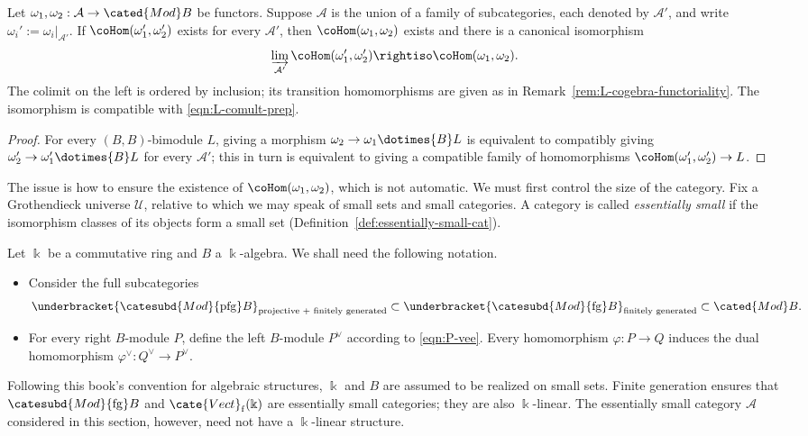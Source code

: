 \begin{proposition}\label{prop:coHom-colim}
	Let $\omega_1,\omega_2:\mathcal{A}\to\cated{Mod}B$ be functors. Suppose
	$\mathcal{A}$ is the union of a family of subcategories, each denoted by
	$\mathcal{A}'$, and write $\omega_i':=\omega_i|_{\mathcal{A}'}$. If
	$\coHom(\omega_1',\omega_2')$ exists for every $\mathcal{A}'$, then
	$\coHom(\omega_1,\omega_2)$ exists and there is a canonical isomorphism
	\[ \varinjlim_{\mathcal{A}'} \coHom(\omega'_1, \omega'_2) \rightiso \coHom(\omega_1, \omega_2). \]
	The colimit on the left is ordered by inclusion; its transition
	homomorphisms are given as in Remark~\ref{rem:L-cogebra-functoriality}.
	The isomorphism is compatible with \eqref{eqn:L-comult-prep}.
\end{proposition}
\begin{proof}
	For every $(B,B)$-bimodule $L$, giving a morphism
	$\omega_2\to\omega_1\dotimes{B}L$ is equivalent to compatibly giving
	$\omega_2'\to\omega_1'\dotimes{B}L$ for every $\mathcal{A}'$; this in turn
	is equivalent to giving a compatible family of homomorphisms
	$\coHom(\omega_1',\omega_2')\to L$.
\end{proof}

The issue is how to ensure the existence of $\coHom(\omega_1,\omega_2)$,
which is not automatic. We must first control the size of the category. Fix
a Grothendieck universe $\mathcal{U}$, relative to which we may speak of
small sets and small categories. A category is called \emph{essentially
small} if the isomorphism classes of its objects form a small set
(Definition~\ref{def:essentially-small-cat}).

\begin{convention}\label{con:Mod-pfg}
	Let $\Bbbk$ be a commutative ring and $B$ a $\Bbbk$-algebra. We shall
	need the following notation.
	\begin{itemize}
		\item Consider the full subcategories
		\[ \underbracket{\catesubd{Mod}{\mathrm{pfg}}B}_{\text{projective + finitely generated}} \subset \underbracket{\catesubd{Mod}{\mathrm{fg}}B}_{\text{finitely generated}} \subset \cated{Mod}B. \]
		\item For every right $B$-module $P$, define the left $B$-module
		$P^\vee$ according to \eqref{eqn:P-vee}. Every homomorphism
		$\varphi:P\to Q$ induces the dual homomorphism
		$\varphi^\vee:Q^\vee\to P^\vee$.
	\end{itemize}
	Following this book's convention for algebraic structures, $\Bbbk$ and
	$B$ are assumed to be realized on small sets. Finite generation ensures
	that $\catesubd{Mod}{\mathrm{fg}}B$ and
	$\cate{Vect}_{\mathrm f}(\Bbbk)$ are essentially small categories; they
	are also $\Bbbk$-linear. The essentially small category $\mathcal{A}$
	considered in this section, however, need not have a $\Bbbk$-linear
	structure.
\end{convention}


